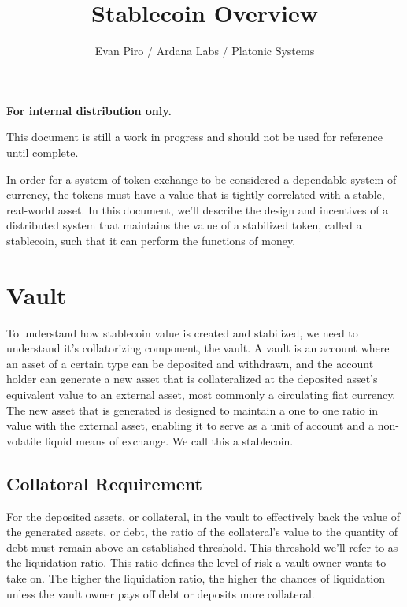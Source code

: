 \documentclass[12pt]{article}
\title{Stablecoin Overview}
\author{Evan Piro / Ardana Labs / Platonic Systems}
\begin{document}
\maketitle

\begin{center}
	\textbf{For internal distribution only.}
\end{center}

\begin{center}
	\color{red} This document is still a work in progress and should not be used for reference until complete.
\end{center}

In order for a system of token exchange to be considered a dependable system of currency, the tokens must have a value that is tightly correlated with a stable, real-world asset. In this document, we'll describe the design and incentives of a distributed system that maintains the value of a stabilized token, called a stablecoin, such that it can perform the functions of money.

\section{Vault}

To understand how stablecoin value is created and stabilized, we need to understand it's collatorizing component, the vault. A vault is an account where an asset of a certain type can be deposited and withdrawn, and the account holder can generate a new asset that is collateralized at the deposited asset's equivalent value to an external asset, most commonly a circulating fiat currency. The new asset that is generated is designed to maintain a one to one ratio in value with the external asset, enabling it to serve as a unit of account and a non-volatile liquid means of exchange. We call this a stablecoin.

\subsection{Collatoral Requirement}

For the deposited assets, or collateral, in the vault to effectively back the value of the generated assets, or debt, the ratio of the collateral's value to the quantity of debt must remain above an established threshold. This threshold we'll refer to as the liquidation ratio. This ratio defines the level of risk a vault owner wants to take on. The higher the liquidation ratio, the higher the chances of liquidation unless the vault owner pays off debt or deposits more collateral.
\end{document}
